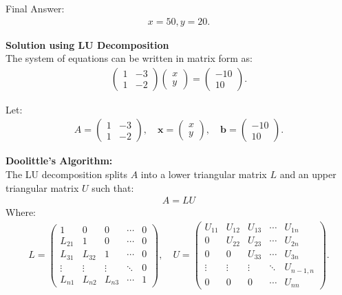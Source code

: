 \documentclass[journal,12pt,onecolumn]{IEEEtran}
\theoremstyle{remark}
\begin{document}
Final Answer:
\begin{align}
	x = 50, y = 20.
\end{align}

\textbf{Solution using LU Decomposition}\\
The system of equations can be written in matrix form as:
\begin{align}
    \begin{pmatrix}
        1 & -3 \\
        1 & -2
    \end{pmatrix}
    \begin{pmatrix}
        x \\ y
    \end{pmatrix}
    =
    \begin{pmatrix}
        -10 \\ 10
    \end{pmatrix}.
\end{align}

Let:
\begin{align}
    A =
    \begin{pmatrix}
        1 & -3 \\
        1 & -2
    \end{pmatrix},
    \quad
    \mathbf{x} =
    \begin{pmatrix}
        x \\ y
    \end{pmatrix},
    \quad
    \mathbf{b} =
    \begin{pmatrix}
        -10 \\ 10
    \end{pmatrix}.
\end{align}

\textbf{Doolittle's Algorithm:}\\
The LU decomposition splits $A$ into a lower triangular matrix $L$ and an upper triangular matrix $U$ such that:
\begin{align}
    A = LU
\end{align}
Where:
\begin{align}
    L = 
    \begin{pmatrix}
        1 & 0 & 0 & \cdots & 0 \\ 
        L_{21} & 1 & 0 & \cdots & 0 \\ 
        L_{31} & L_{32} & 1 & \cdots & 0 \\ 
        \vdots & \vdots & \vdots & \ddots & 0 \\ 
        L_{n1} & L_{n2} & L_{n3} & \cdots & 1
    \end{pmatrix}, \quad
    U = 
    \begin{pmatrix}
        U_{11} & U_{12} & U_{13} & \cdots & U_{1n} \\ 
        0 & U_{22} & U_{23} & \cdots & U_{2n} \\ 
        0 & 0 & U_{33} & \cdots & U_{3n} \\ 
        \vdots & \vdots & \vdots & \ddots & U_{n-1,n} \\ 
        0 & 0 & 0 & \cdots & U_{nn}
    \end{pmatrix}.
\end{align}
\end{document}
